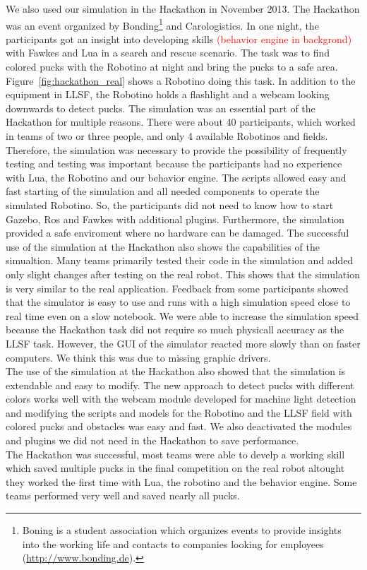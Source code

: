 We also used our simulation in the Hackathon in November 2013. The Hackathon was an event organized by Bonding\footnote{Boning is a student association which organizes events to provide insights into the working life and contacts to companies looking for employees (\url{http://www.bonding.de}).} and Carologistics. In one night, the participants got an insight into developing skills \textcolor{red}{(behavior engine in backgrond)} with Fawkes and Lua in a search and rescue scenario. The task was to find colored pucks with the Robotino at night and bring the pucks to a safe area. Figure~\ref{fig:hackathon_real} shows a Robotino doing this task. In addition to the equipment in LLSF, the Robotino holds a flashlight and a webcam looking downwards to detect pucks. The simulation was an essential part of the Hackathon for multiple reasons. There were about 40 participants, which worked in teams of two or three people, and only 4 available Robotinos and fields. Therefore, the simulation was necessary to provide the possibility of frequently testing and testing was important because the participants had no experience with Lua, the Robotino and our behavior engine. The scripts allowed easy and fast starting of the simulation and all needed components to operate the simulated Robotino. So, the participants did not need to know how to start Gazebo, Ros and Fawkes with additional plugins. Furthermore, the simulation provided a safe enviroment where no hardware can be damaged. The successful use of the simulation at the Hackathon also shows the capabilities of the simualtion. Many teams primarily tested their code in the simulation and added only slight changes after testing on the real robot. This shows that the simulation is very similar to the real application. Feedback from some participants showed that the simulator is easy to use and runs with a high simulation speed close to real time even on a slow notebook. We were able to increase the simulation speed because the Hackathon task did not require so much physicall accuracy as the LLSF task. However, the GUI of the simulator reacted more slowly than on faster computers. We think this was due to missing graphic drivers.\\
The use of the simulation at the Hackathon also showed that the simulation is extendable and easy to modify. The new approach to detect pucks with different colors works well with the webcam module developed for machine light detection and modifying the scripts and  models for the Robotino and the LLSF field with colored pucks and obstacles was easy and fast. We also deactivated the modules and plugins we did not need in the Hackathon to save performance.\\
The Hackathon was successful, most teams were able to develp a working skill which saved multiple pucks in the final competition on the real robot altought they worked the first time with Lua, the robotino and the behavior engine. Some teams performed very well and saved nearly all pucks.

